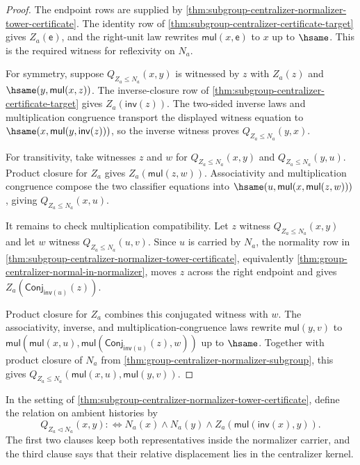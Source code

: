 \begin{proof}
The endpoint rows are supplied by
\autoref{thm:subgroup-centralizer-normalizer-tower-certificate}. The identity
row of \autoref{thm:subgroup-centralizer-certificate-target} gives
$Z_a(\mathsf{e})$, and the right-unit law rewrites
$\mathsf{mul}(x,\mathsf{e})$ to $x$ up to $\hsame$. This is the required
witness for reflexivity on $N_a$.

For symmetry, suppose $Q_{Z_a\leq N_a}(x,y)$ is witnessed by $z$ with
$Z_a(z)$ and $\hsame(y,\mathsf{mul}(x,z))$. The inverse-closure row of
\autoref{thm:subgroup-centralizer-certificate-target} gives
$Z_a(\mathsf{inv}(z))$. The two-sided inverse laws and multiplication
congruence transport the displayed witness equation to
$\hsame(x,\mathsf{mul}(y,\mathsf{inv}(z)))$, so the inverse witness proves
$Q_{Z_a\leq N_a}(y,x)$.

For transitivity, take witnesses $z$ and $w$ for
$Q_{Z_a\leq N_a}(x,y)$ and $Q_{Z_a\leq N_a}(y,u)$. Product closure for $Z_a$
gives $Z_a(\mathsf{mul}(z,w))$. Associativity and multiplication congruence
compose the two classifier equations into
$\hsame(u,\mathsf{mul}(x,\mathsf{mul}(z,w)))$, giving
$Q_{Z_a\leq N_a}(x,u)$.

It remains to check multiplication compatibility. Let $z$ witness
$Q_{Z_a\leq N_a}(x,y)$ and let $w$ witness $Q_{Z_a\leq N_a}(u,v)$. Since
$u$ is carried by $N_a$, the normality row in
\autoref{thm:subgroup-centralizer-normalizer-tower-certificate}, equivalently
\autoref{thm:group-centralizer-normal-in-normalizer}, moves $z$ across the
right endpoint and gives
$Z_a(\mathsf{Conj}_{\mathsf{inv}(u)}(z))$.

Product closure for $Z_a$ combines this conjugated witness with $w$. The
associativity, inverse, and multiplication-congruence laws rewrite
$\mathsf{mul}(y,v)$ to
$\mathsf{mul}(\mathsf{mul}(x,u),
\mathsf{mul}(\mathsf{Conj}_{\mathsf{inv}(u)}(z),w))$ up to $\hsame$.
Together with product closure of $N_a$ from
\autoref{thm:group-centralizer-normalizer-subgroup}, this gives
$Q_{Z_a\leq N_a}(\mathsf{mul}(x,u),\mathsf{mul}(y,v))$.
\end{proof}

\begin{definition}
\label{def:subgroup-centralizer-normalizer-quotient-kernel-relation}
In the setting of
\autoref{thm:subgroup-centralizer-normalizer-tower-certificate}, define the
relation on ambient histories by
$$
Q_{Z_a\triangleleft N_a}(x,y) :\Longleftrightarrow
N_a(x)\land N_a(y)\land
Z_a(\mathsf{mul}(\mathsf{inv}(x),y)).
$$
The first two clauses keep both representatives inside the normalizer carrier,
and the third clause says that their relative displacement lies in the
centralizer kernel.
\end{definition}

